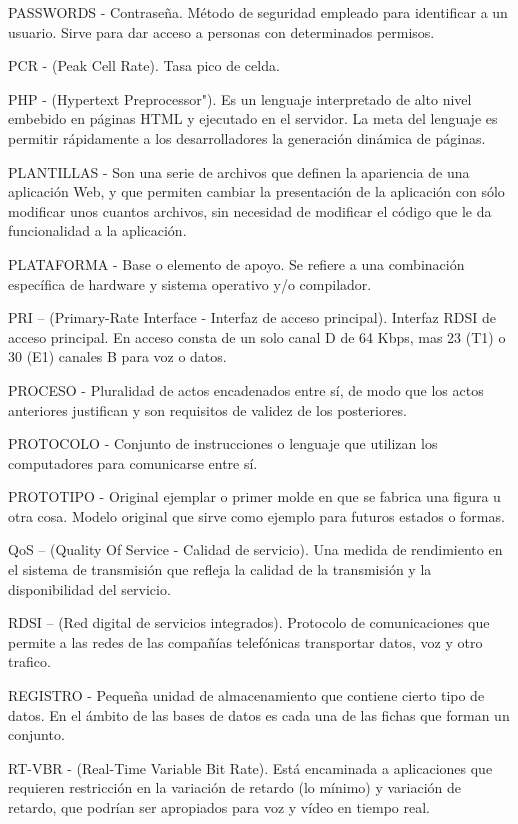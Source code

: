 PASSWORDS - Contraseña. Método de seguridad empleado para identificar a un usuario. Sirve para dar acceso a personas con determinados permisos.

PCR - (Peak Cell Rate). Tasa pico de celda.

PHP - (Hypertext Preprocessor"). Es un lenguaje interpretado de alto nivel embebido en páginas HTML y ejecutado en el servidor. La meta del lenguaje es permitir rápidamente a los desarrolladores la generación dinámica de páginas.

PLANTILLAS -  Son una serie de archivos que definen la apariencia de una aplicación Web, y que permiten cambiar la presentación de la aplicación con sólo modificar unos cuantos archivos, sin necesidad de modificar el código que le da funcionalidad a la aplicación.

PLATAFORMA - Base o elemento de apoyo. Se refiere a una combinación específica de hardware y sistema operativo y/o compilador.

PRI – (Primary-Rate Interface - Interfaz de acceso principal). Interfaz RDSI de acceso principal. En acceso consta de un solo canal D de 64 Kbps, mas 23 (T1) o 30 (E1) canales B para voz o datos.

PROCESO - Pluralidad de actos encadenados entre sí, de modo que los actos anteriores justifican y son requisitos de validez de los posteriores.

PROTOCOLO - Conjunto de instrucciones o lenguaje que utilizan los computadores para comunicarse entre sí.

PROTOTIPO - Original ejemplar o primer molde en que se fabrica una figura u otra cosa. Modelo original que sirve como ejemplo para futuros estados o formas.

QoS – (Quality Of Service - Calidad de servicio). Una medida de rendimiento en el sistema de transmisión que refleja la calidad de la transmisión y la disponibilidad del servicio.

RDSI – (Red digital de servicios integrados). Protocolo de comunicaciones que permite a las redes de las compañías telefónicas transportar datos, voz y otro trafico.

REGISTRO - Pequeña unidad de almacenamiento que contiene cierto tipo de datos. En el ámbito de las bases de datos es cada una de las fichas que forman un conjunto.

RT-VBR - (Real-Time Variable Bit Rate). Está encaminada a aplicaciones que requieren restricción en la variación de retardo (lo mínimo) y variación de retardo, que podrían ser apropiados para voz y vídeo en tiempo real.

